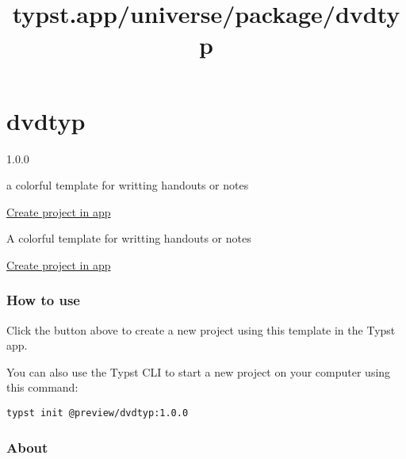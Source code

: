 \title{typst.app/universe/package/dvdtyp}

\label{banner}
\label{template-thumbnail}

\section{dvdtyp}\label{dvdtyp}

{ 1.0.0 }

a colorful template for writting handouts or notes

\href{/app?template=dvdtyp&version=1.0.0}{Create project in app}

\label{readme}
A colorful template for writting handouts or notes


\href{/app?template=dvdtyp&version=1.0.0}{Create project in app}

\subsubsection{How to use}\label{how-to-use}

Click the button above to create a new project using this template in
the Typst app.

You can also use the Typst CLI to start a new project on your computer
using this command:

\begin{verbatim}
typst init @preview/dvdtyp:1.0.0
\end{verbatim}



\subsubsection{About}\label{about}

